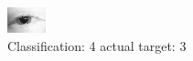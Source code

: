 \begin{figure}[h!]
\begin{center}
\includegraphics[width=0.60\columnwidth]{figures/ID145_class_4_target_3.png}
\end{center}
\caption{ Classification: 4 actual target: 3}
\label{fig:ID145_class_4_target_3}
\end{figure}
